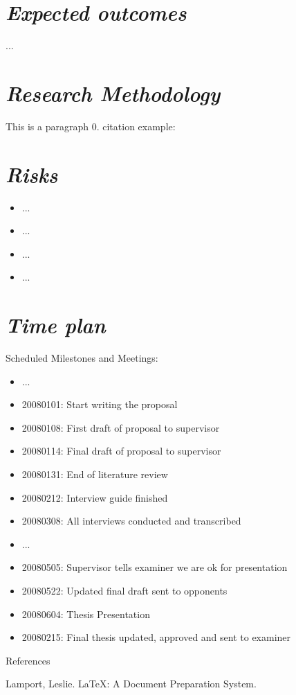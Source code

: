 \documentclass[10pt,english,a4paper]{article}
\begin{document}
\section{\large\textit{Expected outcomes}}
...


\section{\large\textit{Research Methodology}}
This is a paragraph 0. citation example: \cite{5954343,testBook}


\section{\large\textit{Risks}}
\begin{itemize}
\item{...}
\item{...}
\item{...}
\item{...}
\end{itemize}


\section{\large\textit{Time plan}}
Scheduled Milestones and Meetings:
\begin{itemize}
\item{...}
\item{20080101: Start writing the proposal}
\item{20080108: First draft of proposal to supervisor}
\item{20080114: Final draft of proposal to supervisor}
\item{20080131: End of literature review}
\item{20080212: Interview guide finished}
\item{20080308: All interviews conducted and transcribed}
\item{...}
\item{20080505: Supervisor tells examiner we are ok for presentation}
\item{20080522: Updated final draft sent to opponents}
\item{20080604: Thesis Presentation}
\item{20080215: Final thesis updated, approved and sent to examiner}
\end{itemize}

References
\begin{thebibliography}{}
Lamport, Leslie. \LaTeX{}: A Document Preparation
System.
\end{thebibliography}



\end{document}
